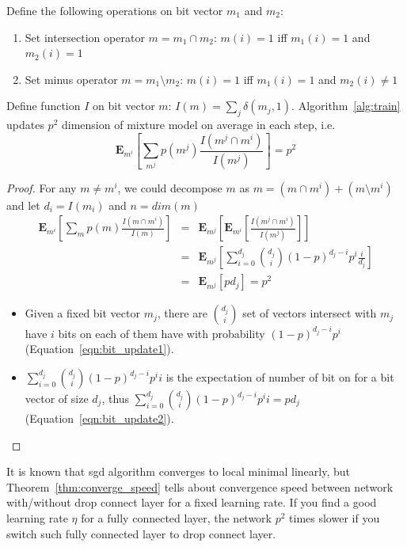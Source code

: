\documentclass[9pt]{article}
\begin{document}
\begin{theorem}
   \label{thm:converge_speed}
   Define the following operations on bit vector $m_1$ and $m_2$:
   \begin{enumerate}
       \item Set intersection operator $m=m_1\cap m_2$: $m(i)=1$ iff $m_1(i)=1$ and $m_2(i)=1$
       \item Set minus operator $m=m_1\setminus m_2$: $m(i)=1$ iff $m_1(i)=1$ and $m_2(i)\neq 1$
   \end{enumerate}
      Define function $I$ on bit vector $m$: $I(m)=\sum_j \delta(m_j,1)$.
   Algorithm~\ref{alg:train} updates $p^2$ dimension of mixture model on average in each step, i.e.
   $$
   {\mathbf E}_{m^i}\left[\sum_{m^j} p(m^j) \frac{I(m^j\cap m^i)}{I(m^j)}\right]=p^2
   $$
\end{theorem}
\begin{proof}
    For any $m\neq m^i$, we could decompose $m$ as 
    $m= \left(m\cap m^i\right) + \left(m\setminus m^i\right)$ and let $d_i=I(m_i)$ and $n=dim(m)$
   \begin{eqnarray}
      {\mathbf E}_{m^i}\left[\sum_{m} p(m) \frac{I(m\cap m^i)}{I(m)}\right]
      &=& {\mathbf E}_{m^j}\left[{\mathbf E}_{m^i}\left[\frac{I(m^j\cap m^i)}{I(m^j)}\right]\right]  \nonumber \\
      &=& {\mathbf E}_{m^j}\left[ \sum_{i=0}^{d_j}\binom{d_j}{i}{(1-p)^{d_j-i}p^i}\frac{i}{d_j}\right] \label{eqn:bit_update1} \\
      &=& {\mathbf E}_{m^j}\left[ pd_j\right]=p^2 \label{eqn:bit_update2}
   \end{eqnarray}
   \begin{itemize}
      \item Given a fixed bit vector $m_j$, there are $\binom{d_j}{i}$ set of vectors intersect with $m_j$ have $i$ bits on
         each of them have with probability $(1-p)^{d_j-i}p^i$ (Equation~\ref{eqn:bit_update1}).
      \item 
         $\sum_{i=0}^{d_j}\binom{d_j}{i}{(1-p)^{d_j-i}p^i}i$ is the expectation of number of bit on for a bit vector of size $d_j$,
         thus $\sum_{i=0}^{d_j}\binom{d_j}{i}{(1-p)^{d_j-i}p^i}i=pd_j$
         (Equation~\ref{eqn:bit_update2}).
   \end{itemize}
\end{proof}
\begin{remark}
   It is known that sgd algorithm converges to local minimal linearly, but 
   Theorem~\ref{thm:converge_speed} tells about convergence speed between
   network with/without drop connect layer for a fixed learning rate. If you
   find a good learning rate $\eta$ for a fully connected layer, the network $p^2$ times
   slower if you switch such fully connected layer to drop connect layer. 
\end{remark}
\end{document}
